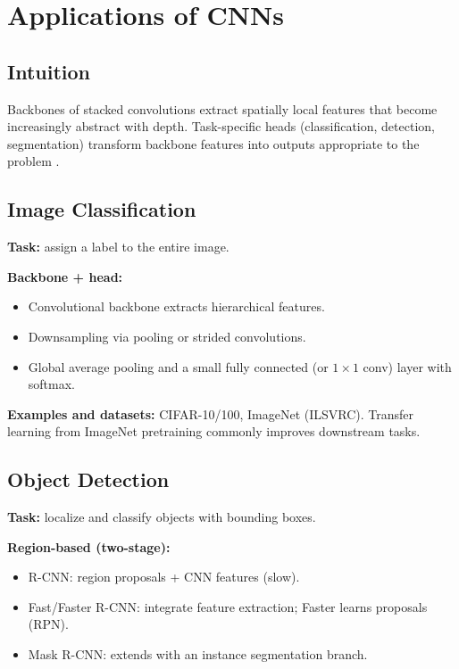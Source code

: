 
\section{Applications of CNNs}
\label{sec:cnn-applications}

\subsection*{Intuition}
Backbones of stacked convolutions extract spatially local features that become increasingly abstract with depth. Task-specific heads (classification, detection, segmentation) transform backbone features into outputs appropriate to the problem \cite{GoodfellowEtAl2016,Prince2023}.
\subsection{Image Classification}

\textbf{Task:} assign a label to the entire image.

\textbf{Backbone + head:}
\begin{itemize}
    \item Convolutional backbone extracts hierarchical features.
    \item Downsampling via pooling or strided convolutions.
    \item Global average pooling and a small fully connected (or $1\times1$ conv) layer with softmax.
\end{itemize}

\textbf{Examples and datasets:} CIFAR-10/100, ImageNet (ILSVRC). Transfer learning from ImageNet pretraining commonly improves downstream tasks.

\subsection{Object Detection}

\textbf{Task:} localize and classify objects with bounding boxes.

\textbf{Region-based (two-stage):}
\begin{itemize}
    \item R-CNN: region proposals + CNN features (slow).
    \item Fast/Faster R-CNN: integrate feature extraction; Faster learns proposals (RPN).
    \item Mask R-CNN: extends with an instance segmentation branch.
\end{itemize}

